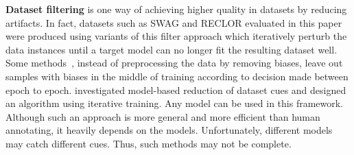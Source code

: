 \textbf{Dataset filtering} is one way of achieving
higher quality in datasets by reducing artifacts. 
In fact, datasets such as SWAG and RECLOR evaluated in this paper
were produced using variants of this filter approach which 
iteratively perturb the data instances until a target 
model can no longer fit the resulting dataset well. 
Some methods~\cite{yaghoobzadeh2019robust}, instead of preprocessing
the data by removing biases, leave out samples with biases 
in the middle of training according to decision made between 
epoch to epoch. \cite{bras2020adversarial} investigated 
model-based reduction of dataset cues and designed an algorithm 
using iterative training. Any model can be used in 
this framework. Although such an approach is more 
general and more efficient than human annotating, 
it heavily depends on the models. Unfortunately, different models
may catch different cues. Thus, such methods may not be complete.





